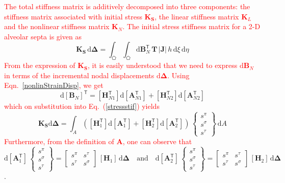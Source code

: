\textcolor{red}{The total stiffness matrix is additively decomposed into three components: the stiffness matrix associated with initial stress $\mathbf{K_S}$, the linear stiffness matrix $\mathbf{K}_L$ and the nonlinear stiffness matrix $\mathbf{K}_N$. The initial stress stiffness matrix  for a 2-D alveolar septa is given as}
\begin{equation}
\mathbf{K}_\mathbf{S}\,\mathrm{d}\boldsymbol{\Delta} = \int_{\pentagon} \int_{\pentagon}  \mathrm{d} \mathbf{B}_N^{\mathsf{T}} \, \mathbf{T} \, |\mathbf{J}|  \, h \,  \mathrm{d} \xi \,  \mathrm{d} \eta \label{stressstif}
\end{equation}
\textcolor{red}{From the expression of $\mathbf{K_{\mathbf{S}}}$, it is easily understood that we need to express $\mathrm{d}\mathbf{B}_N$ in terms of the incremental nodal displacements $\mathrm{d}\boldsymbol{\Delta}$. Using Eqn.~\eqref{nonlinStrainDisp}, we get}
\begin{equation}
\mathrm{d}[\mathbf{B}_N]^{\mathsf{T}} = [\mathbf{H}_{N1}^{\mathsf{T}}] \mathrm{d} [\mathbf{A}_{N1}^{\mathsf{T}}] + [\mathbf{H}_{N2}^{\mathsf{T}}] \mathrm{d} [\mathbf{A}_{N2}^{\mathsf{T}}] 
\end{equation}
\textcolor{red}{which on substitution into Eq.~(\ref{stressstif}) yields} 
\begin{equation}
\mathbf{K_\mathbf{S}} \mathrm{d} \boldsymbol{\Delta} = \int_A \left(
[\mathbf{H}_1^{\mathsf{T}}] \mathrm{d} [\mathbf{A}_1^{\mathsf{T}}] + [\mathbf{H}_2^{\mathsf{T}}] \mathrm{d} [\mathbf{A}_2^{\mathsf{T}}]\right) \, \begin{Bmatrix} s^{\pi} \\ s^{\sigma} \\  s^{\tau} \end{Bmatrix} \, \mathrm{d} A
\label{initstiff}
\end{equation}
\textcolor{red}{Furthermore, from the definition of $\mathbf{A}$, one can observe that}
\begin{equation}
\mathrm{d} [\mathbf{A}_1^{\mathsf{T}}] \, \begin{Bmatrix} s^{\pi} \\ s^{\sigma} \\  s^{\tau} \end{Bmatrix} = \begin{bmatrix}s^{\pi} & s^{\tau} \\ 
s^{\tau} & s^{\sigma} \end{bmatrix} \, [\mathbf{H}_1] \, \mathrm{d} \boldsymbol{\Delta} \quad \text{and} \quad \mathrm{d} [\mathbf{A}_2^{\mathsf{T}}] \, \begin{Bmatrix} s^{\pi} \\ s^{\sigma} \\  s^{\tau} \end{Bmatrix} = \begin{bmatrix} s^{\pi} & s^{\tau} \\ 
s^{\tau} & s^{\sigma} \end{bmatrix} \, [\mathbf{H}_2] \, \mathrm{d} \boldsymbol{\Delta}
\end{equation}.
